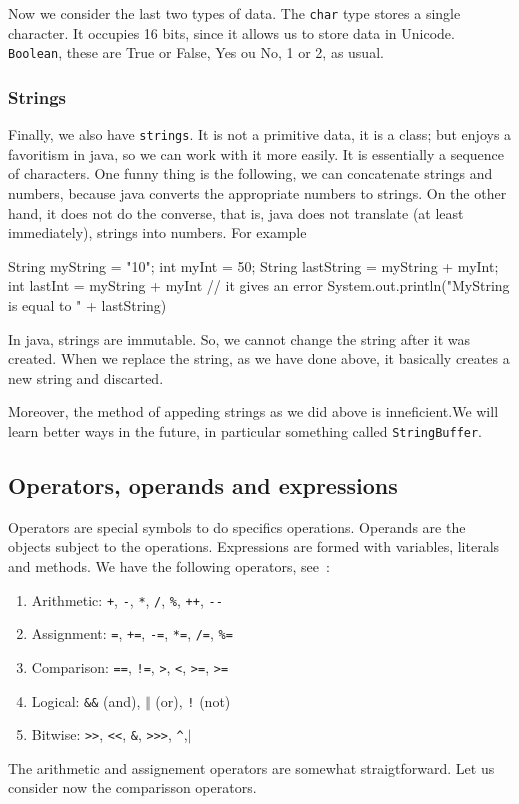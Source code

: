 Now we consider the last two types of data. The \verb|char| type stores a single character. It 
occupies 16 bits, since it allows us to store data in Unicode. \verb|Boolean|, these are True or 
False, Yes ou No, 1 or 2, as usual.


\subsubsection{Strings}

Finally, we also have \verb|strings|. It is not a primitive data, it is a class; but enjoys a favoritism in java, 
so we can work with it more easily. It is essentially a sequence of characters.
One funny thing is the following, we can concatenate strings and numbers, because java converts the 
appropriate numbers to strings. On the other hand, it does not do the converse, that is, java does 
not translate (at least immediately), strings into numbers. For example 
\begin{listing}{1}
    String myString = "10";
    int myInt = 50;
    String lastString = myString + myInt;
    int lastInt = myString + myInt // it gives an error
    System.out.println("MyString is equal to " + lastString)
\end{listing}

In java, strings are immutable. So, we cannot change the string after it was created. When we 
replace the string, as we have done above, it basically creates a new string and discarted.

Moreover, the method of appeding strings as we did above is inneficient.We will learn better ways
in the future, in particular something called \verb|StringBuffer|.

\subsection{Operators, operands and expressions}

Operators are special symbols to do specifics operations. Operands are the objects subject to the 
operations. Expressions are formed with variables, literals and methods. 
We have the following operators, see~\cite{w3school}:
\begin{enumerate}
    \item Arithmetic: \verb|+|, \verb|-|, \verb|*|, \verb|/|, \verb|%|, \verb|++|, \verb|--|
    \item Assignment: \verb|=|, \verb|+=|, \verb|-=|, \verb|*=|, \verb|/=|, \verb|%=|
    \item Comparison: \verb|==|, \verb|!=|, \verb|>|, \verb|<|, \verb|>=|, \verb|>=|
    \item Logical: \verb|&&| (and), \(\Vert\) (or), \verb|!| (not)
    \item Bitwise: \verb|>>|, \verb|<<|, \verb|&|, \verb|>>>|, \verb|^|,\(\vert\)
\end{enumerate}
The arithmetic and assignement operators are somewhat straigtforward. 
Let us consider now the comparisson operators.


